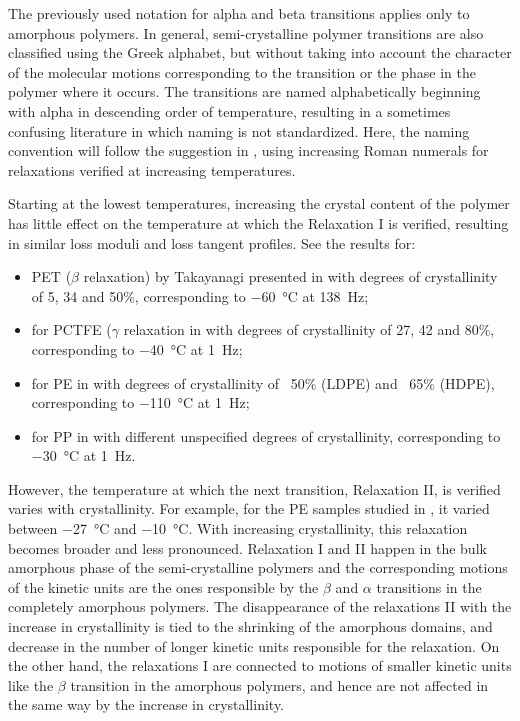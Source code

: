 The previously used notation for alpha and beta transitions applies only to amorphous polymers.
In general, semi-crystalline polymer transitions are also classified using the Greek alphabet, but without taking into account the character of the molecular motions corresponding to the transition or the phase in the polymer where it occurs.
The transitions are named alphabetically beginning with alpha in descending order of temperature, resulting in a sometimes confusing literature in which naming is not standardized.
Here, the naming convention will follow the suggestion in \cite{arzhakovRelaxationPhysicalMechanical2019}, using increasing Roman numerals for relaxations verified at increasing temperatures.

Starting at the lowest temperatures, increasing the crystal content of the polymer has little effect on the temperature at which the Relaxation I is verified, resulting in similar loss moduli and loss tangent profiles.
See the results for:
\begin{itemize}
	\item PET ($\beta$ relaxation) by Takayanagi presented in \cite{wardIntroductionMechanicalProperties2004} with degrees of crystallinity of 5, 34 and 50\%, corresponding to \SI{-60}{\celsius} at \SI{138}{\hertz};
	\item for PCTFE ($\gamma$ relaxation in \cite{mccrumVariationInternalFriction1962} with degrees of crystallinity of 27, 42 and 80\%, corresponding to \SI{-40}{\celsius} at \SI{1}{\hertz};
	\item for PE in \cite{khannaDynamicMechanicalRelaxations1985} with degrees of crystallinity of ~50\% (LDPE) and ~65\% (HDPE), corresponding to \SI{-110}{\celsius} at \SI{1}{\hertz};
	\item for PP in \cite{mccrumStudyInternalFriction1959} with different unspecified degrees of crystallinity, corresponding to \SI{-30}{\celsius} at \SI{1}{\hertz}.
\end{itemize}

However, the temperature at which the next transition, Relaxation II, is verified varies with crystallinity.
For example, for the PE samples studied in \cite{khannaDynamicMechanicalRelaxations1985}, it varied between \SI{-27}{\celsius} and \SI{-10}{\celsius}.
With increasing crystallinity, this relaxation becomes broader and less pronounced.
Relaxation I and II happen in the bulk amorphous phase of the semi-crystalline polymers and the corresponding motions of the kinetic units are the ones responsible by the $\beta$ and $\alpha$ transitions in the completely amorphous polymers.
The disappearance of the relaxations II with the increase in crystallinity is tied to the shrinking of the amorphous domains, and decrease in the number of longer kinetic units responsible for the relaxation.
On the other hand, the relaxations I are connected to motions of smaller kinetic units like the $\beta$ transition in the amorphous polymers, and hence are not affected in the same way by the increase in crystallinity.

